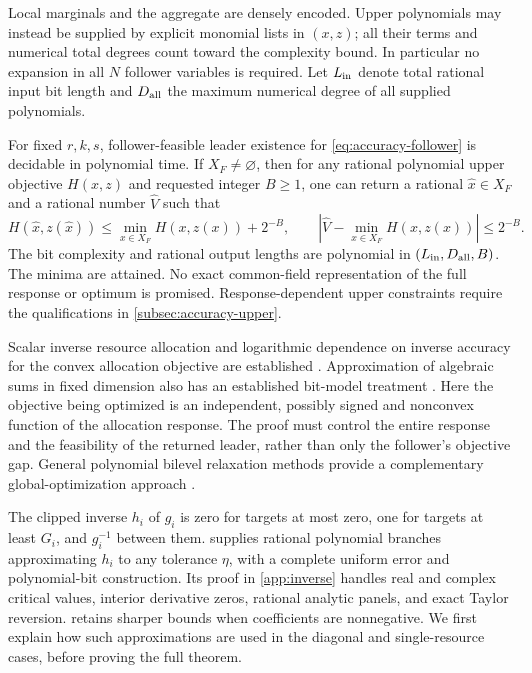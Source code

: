Local marginals and the aggregate are densely encoded. Upper polynomials
may instead be supplied by explicit monomial lists in $(x,z)$; all their
terms and numerical total degrees count toward the complexity bound.
In particular no expansion in all $N$ follower variables is required.
Let $L_{\rm in}$ denote total rational input bit length and $D_{\rm all}$
the maximum numerical degree of all supplied polynomials.

\begin{theorem}\label{thm:accuracy-global}
For fixed $r,k,s$, follower-feasible leader existence for
\eqref{eq:accuracy-follower} is decidable in polynomial time. If
$X_F\ne\varnothing$, then for any rational polynomial upper objective
$H(x,z)$ and requested integer $B\ge1$, one can return a rational
$\widehat x\in X_F$ and a rational number $\widehat V$ such that
\[
 H(\widehat x,z(\widehat x))\le
       \min_{x\in X_F}H(x,z(x))+2^{-B},\qquad
 |\widehat V-\min_{x\in X_F}H(x,z(x))|\le2^{-B}.
\]
The bit complexity and rational output lengths are polynomial in
$(L_{\rm in},D_{\rm all},B)$. The minima are attained. No exact
common-field representation of the full response or optimum is promised.
Response-dependent upper constraints require the qualifications in
\cref{subsec:accuracy-upper}.
\end{theorem}

Scalar inverse resource allocation and logarithmic dependence on inverse
accuracy for the convex allocation objective are established
\cite{PatrikssonStromberg2015,HochbaumShanthikumar1990}.
Approximation of algebraic sums in fixed dimension also has an established
bit-model treatment \cite{Vigneron2014}. Here the objective being
optimized is an independent, possibly signed and nonconvex function of
the allocation response. The proof must control the entire response and
the feasibility of the returned leader, rather than only the follower's
objective gap. General polynomial bilevel relaxation methods provide a
complementary global-optimization approach \cite{JeyakumarEtAl2016}.

The clipped inverse $h_i$ of $g_i$ is zero for targets at most zero,
one for targets at least $G_i$, and $g_i^{-1}$ between them.
 supplies rational polynomial branches
approximating $h_i$ to any tolerance $\eta$, with a complete uniform
error and polynomial-bit construction. Its proof in \cref{app:inverse}
handles real and complex critical values, interior derivative zeros,
rational analytic panels, and exact Taylor reversion.
 retains sharper bounds when coefficients
are nonnegative. We first explain how such approximations are used in
the diagonal and single-resource cases, before proving the full theorem.

